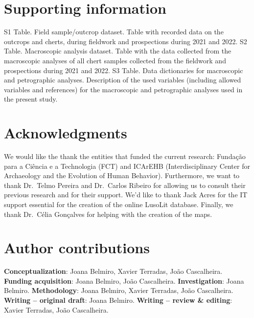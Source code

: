 \documentclass[
  a4paper,
  DIV=11,
  numbers=noendperiod]{scrreprt}
\begin{document}
\section*{Supporting information}\label{supporting-information}


S1 Table. Field sample/outcrop dataset. Table with recorded data on the
outcrops and cherts, during fieldwork and prospections during 2021 and
2022. S2 Table. Macroscopic analysis dataset. Table with the data
collected from the macroscopic analyses of all chert samples collected
from the fieldwork and prospections during 2021 and 2022. S3 Table. Data
dictionaries for macroscopic and petrographic analyses. Description of
the used variables (including allowed variables and references) for the
macroscopic and petrographic analyses used in the present study.

\section*{Acknowledgments}\label{acknowledgments-1}


We would like the thank the entities that funded the current research:
Fundação para a Ciência e a Technologia (FCT) and ICArEHB
(Interdisciplinary Center for Archaeology and the Evolution of Human
Behavior). Furthermore, we want to thank Dr.~Telmo Pereira and
Dr.~Carlos Ribeiro for allowing us to consult their previous research
and for their support. We'd like to thank Jack Acres for the IT support
essential for the creation of the online LusoLit database. Finally, we
thank Dr.~Célia Gonçalves for helping with the creation of the maps.

\section*{Author contributions}\label{author-contributions}


\textbf{Conceptualization}: Joana Belmiro, Xavier Terradas, João
Cascalheira. \textbf{Funding acquisition}: Joana Belmiro, João
Cascalheira. \textbf{Investigation}: Joana Belmiro.
\textbf{Methodology}: Joana Belmiro, Xavier Terradas, João Cascalheira.
\textbf{Writing -- original draft}: Joana Belmiro. \textbf{Writing --
review \& editing}: Xavier Terradas, João Cascalheira.
\end{document}
